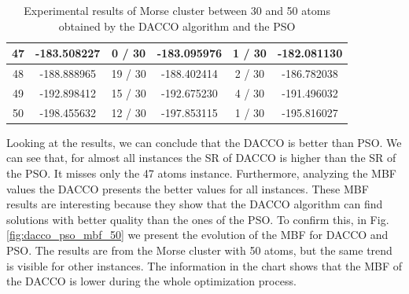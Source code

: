 \begin{table}[!htdp]
\begin{center}
\begin{tabular}{| c | c | c | c | c | c |}
					47 & -183.508227 & 0 / 30 & -183.095976 & 1 / 30 & -182.081130 \\ \hline
					48 & -188.888965 & 19 / 30 & -188.402414 & 2 / 30 & -186.782038 \\ \hline
					49 & -192.898412 & 15 / 30 & -192.675230 & 4 / 30 & -191.496032 \\ \hline
					50 & -198.455632 & 12 / 30 & -197.853115 & 1 / 30 & -195.816027 \\ \hline
				\end{tabular}
			\end{center}
			\caption{Experimental results of Morse cluster between 30 and 50 atoms obtained by the DACCO algorithm and the PSO}
			\label{tab:dacco_vs_pso}
		\end{table}
		
		Looking at the results, we can conclude that the DACCO is better than PSO. We can see that, for almost all instances the SR of DACCO is higher than the SR of the PSO. It misses only the 47 atoms instance. Furthermore, analyzing the MBF values the DACCO presents the better values for all instances. These MBF results are interesting because they show that the DACCO algorithm can find solutions with better quality than the ones of the PSO. To confirm this, in Fig. \ref{fig:dacco_pso_mbf_50} we present the evolution of the MBF for DACCO and PSO. The results are from the Morse cluster with 50 atoms, but the same trend is visible for other instances. The information in the chart shows that the MBF of the DACCO is lower during the whole optimization process.
